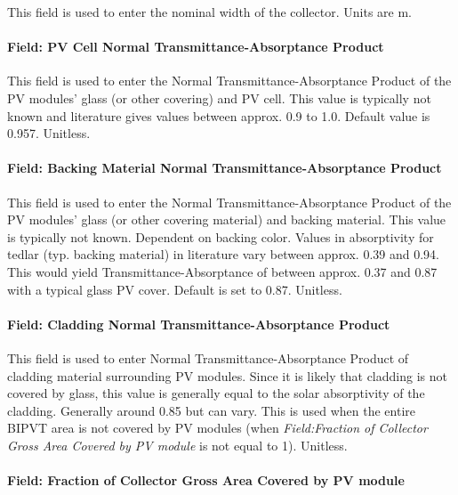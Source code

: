 This field is used to enter the nominal width of the collector. Units are m.



\paragraph{Field: PV Cell Normal Transmittance-Absorptance Product}\label{BIPVT-field-PVcell-tau-alpha}

This field is used to enter the Normal Transmittance-Absorptance Product of the PV modules' glass (or other covering) and PV cell. This value is typically not known and literature gives values between approx. 0.9 to 1.0. Default value is 0.957. Unitless.

\paragraph{Field: Backing Material Normal Transmittance-Absorptance Product}\label{BIPVT-field-backing-tau-alpha}

This field is used to enter the Normal Transmittance-Absorptance Product of the PV modules' glass (or other covering material) and backing material. This value is typically not known. Dependent on backing color. Values in absorptivity for tedlar (typ. backing material) in literature vary between approx. 0.39 and 0.94. This would yield Transmittance-Absorptance of between approx. 0.37 and 0.87 with a typical glass PV cover. Default is set to 0.87. Unitless.

\paragraph{Field: Cladding Normal Transmittance-Absorptance Product}\label{BIPVT-field-cladding-tau-alpha}

This field is used to enter Normal Transmittance-Absorptance Product of cladding material surrounding PV modules. Since it is likely that cladding is not covered by glass, this value is generally equal to the solar absorptivity of the cladding. Generally around 0.85 but can vary. This is used when the entire BIPVT area is not covered by PV modules (when \textit{Field:Fraction of Collector Gross Area Covered by PV module}  is not equal to 1). Unitless.


\paragraph{Field: Fraction of Collector Gross Area Covered by PV module}\label{BIPVT-field-fraction-module}

